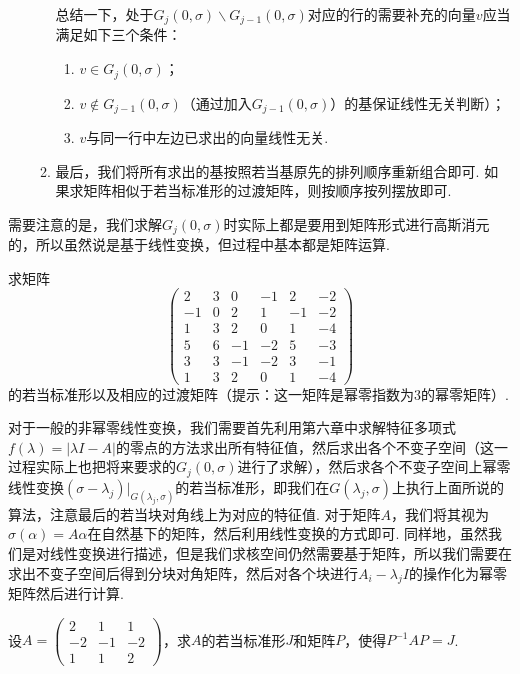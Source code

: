 \begin{enumerate}
\begin{enumerate}
                    总结一下，处于$G_j(0,\sigma)\backslash G_{j-1}(0,\sigma)$对应的行的需要补充的向量$v$应当满足如下三个条件：
                    \begin{enumerate}
                        \item $v\in G_j(0,\sigma)$；

                        \item $v\notin G_{j-1}(0,\sigma)$（通过加入$G_{j-1}(0,\sigma)$）的基保证线性无关判断）；

                        \item $v$与同一行中左边已求出的向量线性无关.
                    \end{enumerate}

              \item 最后，我们将所有求出的基按照若当基原先的排列顺序重新组合即可. 如果求矩阵相似于若当标准形的过渡矩阵，则按顺序按列摆放即可.
          \end{enumerate}
\end{enumerate}
需要注意的是，我们求解$G_j(0,\sigma)$时实际上都是要用到矩阵形式进行高斯消元的，所以虽然说是基于线性变换，但过程中基本都是矩阵运算.
\begin{example}
    求矩阵\[\begin{pmatrix}
            2 & 3 & 0  & -1 & 2 & -2 \\ -1 & 0 & 2 & 1 & -1 & -2 \\
            1 & 3 & 2  & 0  & 1 & -4 \\ 5 & 6 & -1 & -2 & 5 & -3 \\
            3 & 3 & -1 & -2 & 3 & -1 \\ 1 & 3 & 2 & 0 & 1 & -4
        \end{pmatrix}\]的若当标准形以及相应的过渡矩阵（提示：这一矩阵是幂零指数为3的幂零矩阵）.
\end{example}

\begin{solution}

\end{solution}

对于一般的非幂零线性变换，我们需要首先利用第六章中求解特征多项式$f(\lambda)=|\lambda I-A|$的零点的方法求出所有特征值，然后求出各个不变子空间（这一过程实际上也把将来要求的$G_j(0,\sigma)$进行了求解），然后求各个不变子空间上幂零线性变换$(\sigma-\lambda_j)\vert_{G(\lambda_j,\sigma)}$的若当标准形，即我们在$G(\lambda_j,\sigma)$上执行上面所说的算法，注意最后的若当块对角线上为对应的特征值. 对于矩阵$A$，我们将其视为$\sigma(\alpha)=A\alpha$在自然基下的矩阵，然后利用线性变换的方式即可. 同样地，虽然我们是对线性变换进行描述，但是我们求核空间仍然需要基于矩阵，所以我们需要在求出不变子空间后得到分块对角矩阵，然后对各个块进行$A_i-\lambda_jI$的操作化为幂零矩阵然后进行计算.
\begin{example}
    设$A=\begin{pmatrix}
            2 & 1 & 1 \\ -2 & -1 & -2 \\ 1 & 1 & 2
        \end{pmatrix}$，求$A$的若当标准形$J$和矩阵$P$，使得$P^{-1}AP=J$.
\end{example}

